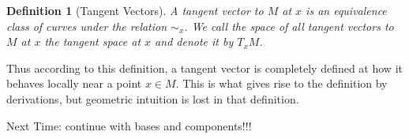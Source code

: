 \documentclass[a4paper]{article}
\newtheorem*{defn}{Definition}
\begin{document}
\begin{defn}[Tangent Vectors]
 A tangent vector to $M$ at $x$ is an equivalence class of curves under the relation $\sim_x$. We call the space of all tangent vectors to $M$ at $x$ the tangent space at $x$ and denote it by $T_xM$.
\end{defn}

Thus according to this definition, a tangent vector is completely defined at how it behaves locally near a point $x \in M$. This is what gives rise to the definition by derivations, but geometric intuition is lost in that definition.

Next Time: continue with bases and components!!!
\end{document}
